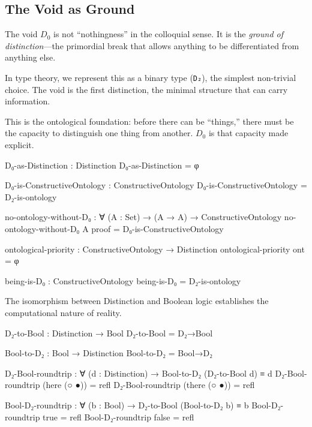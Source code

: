 \documentclass[11pt,a4paper]{book}
\begin{document}
\subsection{The Void as Ground}

The void $D_0$ is not ``nothingness'' in the colloquial sense. It is the \emph{ground of distinction}---the primordial break that allows anything to be differentiated from anything else.

In type theory, we represent this as a binary type (\texttt{D₂}), the simplest non-trivial choice.
The void is the first distinction, the minimal structure that can carry information.

This is the ontological foundation: before there can be ``things,'' there must be the capacity to distinguish one thing from another.
$D_0$ is that capacity made explicit.

\begin{code}
D₀-as-Distinction : Distinction
D₀-as-Distinction = φ

D₀-is-ConstructiveOntology : ConstructiveOntology
D₀-is-ConstructiveOntology = D₂-is-ontology
\end{code}

\begin{code}
no-ontology-without-D₀ : 
  ∀ (A : Set) → 
  (A → A) →
  ConstructiveOntology
no-ontology-without-D₀ A proof = D₀-is-ConstructiveOntology

ontological-priority : 
  ConstructiveOntology → 
  Distinction
ontological-priority ont = φ

being-is-D₀ : ConstructiveOntology
being-is-D₀ = D₂-is-ontology

\end{code}

The isomorphism between Distinction and Boolean logic establishes the computational nature of reality.

\begin{code}
D₂-to-Bool : Distinction → Bool
D₂-to-Bool = D₂→Bool

Bool-to-D₂ : Bool → Distinction
Bool-to-D₂ = Bool→D₂
\end{code}

\begin{code}
D₂-Bool-roundtrip : ∀ (d : Distinction) → Bool-to-D₂ (D₂-to-Bool d) ≡ d
D₂-Bool-roundtrip (here (○ ●))  = refl
D₂-Bool-roundtrip (there (○ ●)) = refl

Bool-D₂-roundtrip : ∀ (b : Bool) → D₂-to-Bool (Bool-to-D₂ b) ≡ b
Bool-D₂-roundtrip true  = refl
Bool-D₂-roundtrip false = refl
\end{code}
\end{document}
